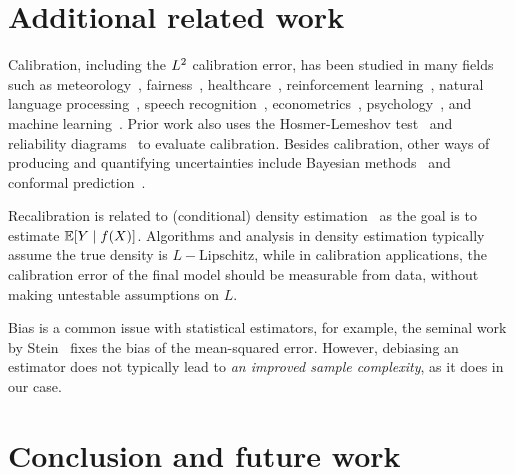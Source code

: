 \section{Additional related work}

Calibration, including the $L^2$ calibration error, has been studied in many fields such as meteorology~\cite{murphy1973vector, murphy1977reliability, degroot1983forecasters,gneiting2005weather, brocker2009decomposition}, fairness~\cite{johnson2018multicalibration, liu2019implicit}, healthcare~\cite{jiang2012calibrating, crowson2017calibration, harrell1996prognostic, yadlowsky2019calibration}, reinforcement learning~\cite{malik2019calibrated}, natural language processing~\cite{nguyen2015posterior, card2018calibration}, speech recognition~\cite{dong2011calibration}, econometrics~\cite{gneiting2007probabilistic}, psychology~\cite{lichtenstein1982calibration}, and machine learning~\cite{guo2017calibration, zadrozny2001calibrated, kuleshov2018accurate, zadrozny2002transforming, naeini2014binary, hendrycks2019anomaly, hendrycks2019pretraining, kull2019temperature}.
Prior work also uses the Hosmer-Lemeshov test~\cite{hosmer1980goodness} and reliability diagrams~\cite{degroot1983forecasters, brocker2007reliability} to evaluate calibration.
Besides calibration, other ways of producing and quantifying uncertainties include Bayesian methods~\cite{gelman1995bayesian} and conformal prediction~\cite{shafer2008tutorial, lei2016distribution}.

Recalibration is related to (conditional) density estimation~\cite{wasserman2019, parzen1962} as the goal is to estimate $\mathbb{E}[Y \mid f(X)]$.
Algorithms and analysis in density estimation typically assume the true density is $L-$Lipschitz, while in calibration applications, the calibration error of the final model should be measurable from data, without making untestable assumptions on $L$.


Bias is a common issue with statistical estimators, for example, the seminal work by Stein~\cite{stein81sure} fixes the bias of the mean-squared error. However, debiasing an estimator does not typically lead to \emph{an improved sample complexity}, as it does in our case.

\section{Conclusion and future work}

